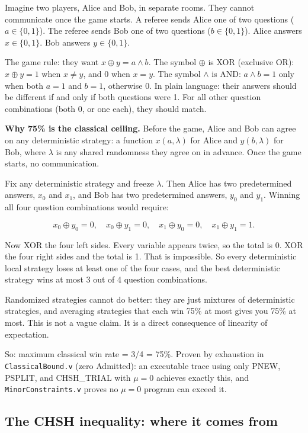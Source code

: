 \documentclass[11pt,a4paper]{article}
\theoremstyle{plain}
\theoremstyle{definition}
\theoremstyle{remark}
\begin{document}
Imagine two players, Alice and Bob, in separate rooms. They cannot communicate once the game starts. A referee sends Alice one of two questions ($a \in \{0,1\}$). The referee sends Bob one of two questions ($b \in \{0,1\}$). Alice answers $x \in \{0,1\}$. Bob answers $y \in \{0,1\}$.

The game rule: they want $x \oplus y = a \land b$. The symbol $\oplus$ is XOR (exclusive OR): $x \oplus y = 1$ when $x \neq y$, and $0$ when $x = y$. The symbol $\land$ is AND: $a \land b = 1$ only when both $a = 1$ and $b = 1$, otherwise 0. In plain language: their answers should be different if and only if both questions were 1. For all other question combinations (both 0, or one each), they should match.

\medskip
\noindent\textbf{Why 75\% is the classical ceiling.}
Before the game, Alice and Bob can agree on any deterministic strategy: a function $x(a, \lambda)$ for Alice and $y(b, \lambda)$ for Bob, where $\lambda$ is any shared randomness they agree on in advance. Once the game starts, no communication.

Fix any deterministic strategy and freeze $\lambda$. Then Alice has two predetermined answers, $x_0$ and $x_1$, and Bob has two predetermined answers, $y_0$ and $y_1$. Winning all four question combinations would require:

\[
x_0 \oplus y_0 = 0,\quad
x_0 \oplus y_1 = 0,\quad
x_1 \oplus y_0 = 0,\quad
x_1 \oplus y_1 = 1.
\]

Now XOR the four left sides. Every variable appears twice, so the total is 0. XOR the four right sides and the total is 1. That is impossible. So every deterministic local strategy loses at least one of the four cases, and the best deterministic strategy wins at most 3 out of 4 question combinations.

Randomized strategies cannot do better: they are just mixtures of deterministic strategies, and averaging strategies that each win 75\% at most gives you 75\% at most. This is not a vague claim. It is a direct consequence of linearity of expectation.

So: maximum classical win rate = 3/4 = 75\%. Proven by exhaustion in \texttt{ClassicalBound.v} (zero Admitted): an executable trace using only PNEW, PSPLIT, and CHSH\_TRIAL with $\mu = 0$ achieves exactly this, and \texttt{MinorConstraints.v} proves no $\mu = 0$ program can exceed it.

\subsection{The CHSH inequality: where it comes from}
\end{document}
